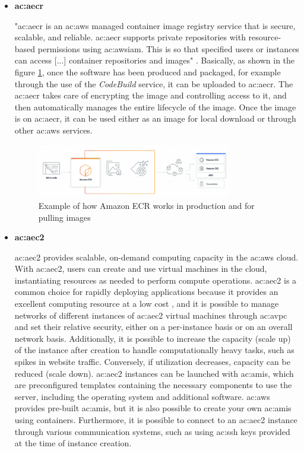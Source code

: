 \begin{itemize}
    \item[] \textbf{\gls{ac:aecr}}
    
    "\gls{ac:aecr} is an \gls{ac:aws} managed container image registry service that is secure, scalable, and reliable. \gls{ac:aecr} supports private repositories with resource-based permissions using \gls{ac:awsiam}. This is so that specified users or instances can access [...] container repositories and images" \cite{AmazonECR}. Basically, as shown in the figure \ref{fig:AWSECR}, once the software has been produced and packaged, for example through the use of the \textit{CodeBuild} service, it can be uploaded to \gls{ac:aecr}. The \gls{ac:aecr} takes care of encrypting the image and controlling access to it, and then automatically manages the entire lifecycle of the image. Once the image is on \gls{ac:aecr}, it can be used either as an image for local download or through other \gls{ac:aws} services. 
    \begin{figure}[h]  %
        \centering
        \includegraphics[width=0.8\textwidth]{images/AWSECR.png}  %
        \caption{Example of how Amazon ECR works in production and for pulling images \cite{AWSECR}}
        \label{fig:AWSECR}
    \end{figure}
    
    \item[] \textbf{\gls{ac:aec2}}
    
    \gls{ac:aec2} provides scalable, on-demand computing capacity in the \gls{ac:aws} cloud. With \gls{ac:aec2}, users can create and use virtual machines in the cloud, instantiating resources as needed to perform compute operations. \gls{ac:aec2} is a common choice for rapidly deploying applications because it provides an excellent computing resource at a low cost \cite{AWSEC2}, and it is possible to manage networks of different instances of \gls{ac:aec2} virtual machines through \gls{ac:avpc} and set their relative security, either on a per-instance basis or on an overall network basis. Additionally, it is possible to increase the capacity (scale up) of the instance after creation to handle computationally heavy tasks, such as spikes in website traffic. Conversely, if utilization decreases, capacity can be reduced (scale down). \gls{ac:aec2} instances can be launched with \gls{ac:ami}s, which are preconfigured templates containing the necessary components to use the server, including the operating system and additional software. \gls{ac:aws} provides pre-built \gls{ac:ami}s, but it is also possible to create your own \gls{ac:ami}s using containers. Furthermore, it is possible to connect to an \gls{ac:aec2} instance through various communication systems, such as using \gls{ac:ssh} keys provided at the time of instance creation.
          

\end{itemize}
